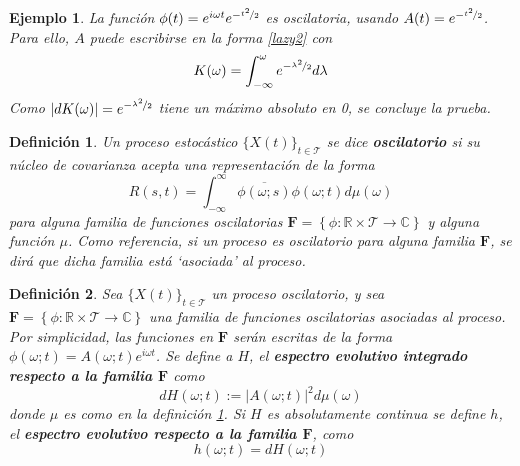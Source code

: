 \documentclass[12pt,letterpaper]{book}
\newtheorem{definicion}{Definición}[chapter]
\newtheorem{ejemplo}{Ejemplo}[chapter]
\newcommand{\R}{\mathbb{R}}
\newcommand{\C}{\mathbb{C}}
\newcommand{\intR}{\int_{-\infty}^{\infty}}
\newcommand{\ef}{\mathbf{F}}
\newcommand{\abso}[1]{\left| #1 \right|}
\newcommand{\xt}{$\{X(t)\}_{t\in \mathcal{T}}$ }
\begin{document}
\begin{ejemplo}
La función $\phi(t) = e^{i \omega t} e^{-\nicefrac{t^2}{2}}$ es oscilatoria, usando $A(t) = e^{-\nicefrac{t^2}{2}}$.
% 
Para ello, $A$ puede escribirse en la forma \ref{lazy2} con 
\begin{equation}
K(\omega) = \int_{-\infty}^{\omega}  e^{-\nicefrac{\lambda^2}{2}} d\lambda
\end{equation}
Como $\abso{dK(\omega)} = e^{-\nicefrac{\lambda^2}{2}}$ tiene un máximo absoluto en 0, se concluye la prueba. 
\label{ejemplo:oscilatorios2}
\end{ejemplo}

\begin{definicion}
Un proceso estocástico \xt se dice \textbf{oscilatorio} si su núcleo de covarianza acepta una representación de la forma
\begin{equation}
R(s,t) = \intR \overline{\phi(\omega;s)}\phi(\omega;t) d\mu(\omega)
\end{equation}
para alguna familia de funciones oscilatorias $\ef = \left\{ \phi: \R \times \mathcal{T} \rightarrow \C \right\}$ y alguna función $\mu$.
%
Como referencia, si un proceso es oscilatorio para alguna familia $\ef$, se dirá que dicha familia está \textit{`asociada'} al proceso.
\label{def:proc_oscilatorio}
\end{definicion}

\begin{definicion}
Sea \xt un proceso oscilatorio, y sea $\ef = \left\{ \phi: \R \times \mathcal{T} \rightarrow \C \right\}$ una familia de funciones oscilatorias asociadas al proceso.
%
Por simplicidad, las funciones en $\ef$ serán escritas de la forma $\phi(\omega;t) = A(\omega;t) e^{i \omega t}$.
% 
Se define a $H$, el \textbf{espectro evolutivo integrado respecto a la familia $\ef$} como
\begin{equation}
dH(\omega; t) := \abso{A(\omega;t)}^{2} d\mu(\omega)
\end{equation}
donde $\mu$ es como en la definición \ref{def:proc_oscilatorio}.
%
Si $H$ es absolutamente continua se define $h$, el \textbf{espectro evolutivo respecto a la familia $\ef$}, como
\begin{equation}
h(\omega; t) = dH(\omega; t)
\end{equation}
\label{def:espectro}
\end{definicion}
\end{document}
